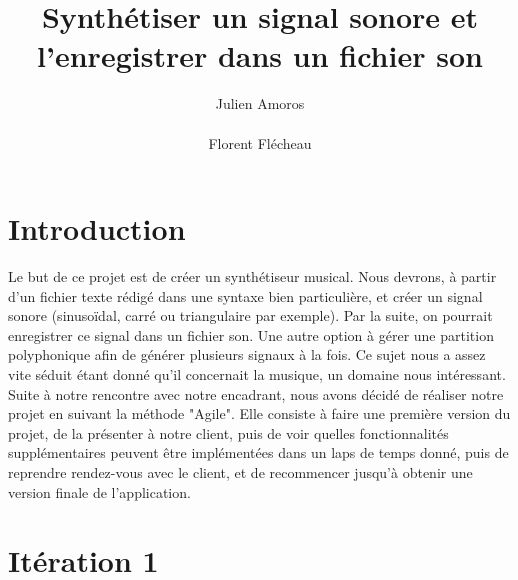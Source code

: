 \documentclass{EPUProjetPeiP}
\title[Synthétiseur Musical]{Synthétiser un signal sonore et l'enregistrer dans un fichier son}
\author{Julien Amoros\\ %
\noindent[\url{julien.amoros@etu.univ-tours.fr}]\\
Florent Flécheau\\ %
\noindent[\url{florent.flecheau@etu.univ-tours.fr}]}
\begin{document}
\maketitle

\setcounter{page}{0}

{
\setlength{\parskip}{0em}

\tableofcontents

\listoffigures

}

\start

\chapter*{Introduction}

Le but de ce projet est de créer un synthétiseur musical. Nous devrons, à partir d'un fichier texte rédigé dans une syntaxe bien particulière, et créer un signal sonore (sinusoïdal, carré ou triangulaire par exemple). Par la suite, on pourrait enregistrer ce signal dans un fichier son. Une autre option à gérer une partition polyphonique afin de générer plusieurs signaux à la fois. 
Ce sujet nous a assez vite séduit étant donné qu'il concernait la musique, un domaine nous intéressant.
Suite à notre rencontre avec notre encadrant, nous avons décidé de réaliser notre projet en suivant la méthode "Agile". Elle consiste à faire une première version du projet, de la présenter à notre client, puis de voir quelles fonctionnalités supplémentaires peuvent être implémentées dans un laps de temps donné, puis de reprendre rendez-vous avec le client, et de recommencer jusqu'à obtenir une version finale de l'application.


\chapter{Itération 1}
\end{document}
